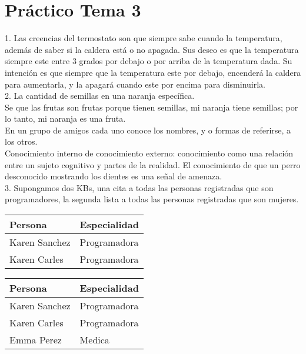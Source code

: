 \chapter{Práctico Tema 3}

1. Las creencias del termostato son que siempre sabe cuando la temperatura, además de saber si la caldera está o no apagada. Sus deseo es que la temperatura siempre este entre 3 grados por debajo o por arriba de la temperatura dada. Su intención es que siempre que la temperatura este por debajo, encenderá la caldera para aumentarla, y la apagará cuando este por encima para disminuirla. \\


2. La cantidad de semillas en una naranja específica. \\

Se que las frutas son frutas porque tienen semillas, mi naranja tiene semillas; por lo tanto, mi naranja es una fruta. \\

En un grupo de amigos cada uno conoce los nombres, y o formas de referirse, a los otros. \\

Conocimiento interno de conocimiento externo: conocimiento como una relación entre un sujeto cognitivo y partes de la realidad. 
El conocimiento de que un perro desconocido mostrando los dientes es una señal de amenaza. \\

3. Supongamos dos KBs, una cita a todas las personas registradas que son programadores, la segunda lista a todas las personas registradas que son mujeres.

\begin{table}[h]
	\begin{tabular}{l|l}
		Persona       & Especialidad \\ \hline
		Karen Sanchez & Programadora \\
		Karen Carles & Programadora  \\
	\end{tabular}
\end{table}


\begin{table}[h]
	\begin{tabular}{l|l}
		Persona       & Especialidad  \\ \hline
		Karen Sanchez & Programadora  \\
		Karen Carles & Programadora   \\
		Emma Perez & Medica           \\
	\end{tabular}
\end{table}

